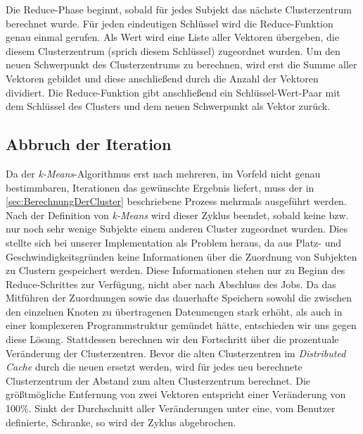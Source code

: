 \documentclass[a4paper]{llncs}
\begin{document}
Die Reduce-Phase beginnt, sobald für jedes Subjekt das nächste Clusterzentrum berechnet wurde.
Für jeden eindeutigen Schlüssel wird die Reduce-Funktion genau einmal gerufen. Als Wert wird eine Liste aller Vektoren übergeben, 
die diesem Clusterzentrum (sprich diesem Schlüssel) zugeordnet wurden. Um den neuen Schwerpunkt des Clusterzentrums zu berechnen,
wird erst die Summe aller Vektoren gebildet und diese anschließend durch die Anzahl der Vektoren dividiert.
Die Reduce-Funktion gibt anschließend ein Schlüssel-Wert-Paar mit dem Schlüssel des Clusters und dem neuen Schwerpunkt als Vektor zurück.

\subsection{Abbruch der Iteration}
Da der \emph{k-Means}-Algorithmus erst nach mehreren, im Vorfeld nicht genau bestimmbaren, Iterationen das gewünschte Ergebnis liefert,
muss der in \ref{sec:BerechnungDerCluster} beschriebene Prozess mehrmals ausgeführt werden.
Nach der Definition von \emph{k-Means} wird dieser Zyklus beendet, sobald keine bzw. nur noch sehr wenige Subjekte einem anderen Cluster zugeordnet wurden.
Dies stellte sich bei unserer Implementation als Problem heraus, da aus Platz- und Geschwindigkeitsgründen keine Informationen über die Zuordnung von Subjekten zu Clustern gespeichert werden. Diese Informationen stehen nur zu Beginn des Reduce-Schrittes zur Verfügung, nicht aber nach Abschluss des Jobs.
Da das Mitführen der Zuordnungen sowie das dauerhafte Speichern sowohl die zwischen den einzelnen Knoten zu übertragenen Datenmengen stark erhöht,
als auch in einer komplexeren Programmstruktur gemündet hätte, entschieden wir uns gegen diese Lösung. 
Stattdessen berechnen wir den Fortschritt über die prozentuale Veränderung der Clusterzentren. Bevor die alten Clusterzentren im \emph{Distributed Cache} durch die neuen ersetzt werden, wird für jedes neu berechnete Clusterzentrum der Abstand zum alten Clusterzentrum berechnet. 
Die größtmögliche Entfernung von zwei Vektoren entspricht einer Veränderung von 100\%. Sinkt der Durchschnitt aller Veränderungen unter eine, vom Benutzer definierte, Schranke, so wird der Zyklus abgebrochen.
\end{document}
